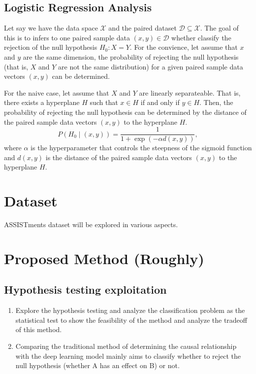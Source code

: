 \documentclass{article}
\begin{document}
\subsection{Logistic Regression Analysis}
Let say we have the data space $\mathcal{X}$ and the paired dataset $\mathcal{D} \subseteq \mathcal{X}$. The goal of this is to infers to one paired sample data
$(x,y) \in \mathcal{D}$ whether classify the rejection of the null hypothesis $H_0: X = Y$. For the convience, let assume that $x$ and $y$ are the same dimension,
the probability of rejecting the null hypothesis (that is, $X$ and $Y$ are not the same distribution) for a given paired sample data vectors $(x,y)$ can be determined.

For the naive case, let assume that $X$ and $Y$ are linearly separateable. That is, there exists a hyperplane $H$ such that $x \in H$ if and only if $y \in H$. 
Then, the probability of rejecting the null hypothesis can be determined by the distance of the paired sample data vectors $(x,y)$ to the hyperplane $H$.
\begin{equation}
    P(H_0 \mid (x,y)) = \frac{1}{1 + \exp(-\alpha d(x,y))},
\end{equation}
where $\alpha$ is the hyperparameter that controls the steepness of the sigmoid function and $d(x,y)$ is the distance of the paired sample data vectors $(x,y)$ to the hyperplane $H$.
\section{Dataset}
ASSISTments dataset\cite{assistment} will be explored in various aspects.
\section{Proposed Method (Roughly)}
\subsection{Hypothesis testing exploitation}
\begin{enumerate}
    \item Explore the hypothesis testing and analyze the classification problem as the 
    statistical test to show the feasibility of the method and analyze the tradeoff of this 
    method.
    \item Comparing the traditional method of determining the causal relationship with the 
    deep learning model mainly aims to classify whether to reject the null hypothesis 
    (whether A has an effect on B) or not.
\end{enumerate}
\end{document}
